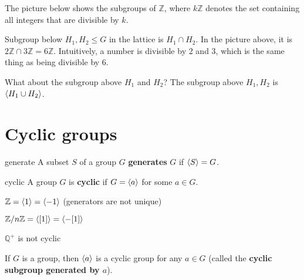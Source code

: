 The picture below shows the subgroups of $\mathbb Z$, where $k\mathbb Z$ denotes the set containing all integers that are divisible by $k$.

\begin{center}
\end{center}

Subgroup below $H_1,H_2\le G$ in the lattice is $H_1\cap H_2$. In the picture above, it is $2\mathbb Z\cap 3\mathbb Z=6\mathbb Z$. Intuitively, a number is divisible by 2 and 3, which is the same thing as being divisible by 6.

What about the subgroup above $H_1$ and $H_2$? The subgroup above $H_1,H_2$ is $\left\langle H_1\cup H_2 \right\rangle$.


\section{Cyclic groups}
\begin{defn}{generate}
A subset $S$ of a group $G$ \textbf{generates} $G$ if $\left\langle S \right\rangle=G$.
\end{defn}

\begin{defn}{cyclic}
A group $G$ is \textbf{cyclic} if $G=\left\langle a \right\rangle$ for some $a\in G$.
\end{defn}

\begin{ex}
$\mathbb Z=\left\langle 1 \right\rangle = \left\langle -1 \right\rangle$ (generators are not unique)

$\mathbb Z/n\mathbb Z=\left\langle [1] \right\rangle = \left\langle -[1] \right\rangle$

$\mathbb Q^+ $ is not cyclic

If $G$ is a group, then $\left\langle a \right\rangle$ is a cyclic group for any $a\in G$ (called the \textbf{cyclic subgroup generated by $a$}).
\end{ex}

